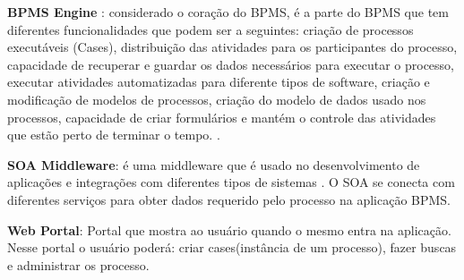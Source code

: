     \textbf{BPMS Engine }: considerado o coração do BPMS, é a parte do BPMS que tem diferentes funcionalidades que podem ser a seguintes: criação de processos executáveis (Cases), distribuição das atividades para os participantes do processo, capacidade de recuperar e guardar os dados necessários para executar o processo, executar atividades automatizadas para diferente tipos de software, criação e modificação de modelos de processos, criação do modelo de dados usado nos processos, capacidade de criar formulários e mantém o controle das atividades que estão perto de terminar o tempo.   \cite{ProcessAwareBPM}.
    
    \textbf{SOA Middleware}: é uma middleware que é usado no desenvolvimento de aplicações e integrações com diferentes tipos de sistemas \cite{CBOK}. O SOA se conecta com diferentes serviços para obter dados requerido pelo processo na aplicação BPMS.
    
    \textbf{Web Portal}: Portal que mostra ao usuário quando o mesmo entra na aplicação. Nesse portal o usuário poderá: criar cases(instância de um processo), fazer buscas e administrar os processo.  
    
    


















